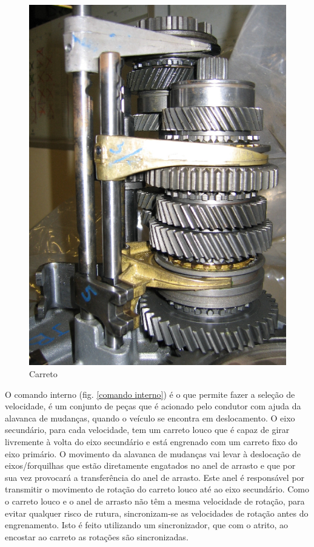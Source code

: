 \begin{figure}[H]
\centering
\includegraphics[scale=1.0]{figs/carretos}
\caption{Carreto \cite{formacaoCaixa}}\label{carreto}
\end{figure}

O comando interno (fig. \ref{comando interno}) é o que permite fazer a seleção de velocidade, é um conjunto de peças que é acionado pelo condutor com ajuda da alavanca de mudanças, quando o veículo se encontra em deslocamento. O eixo secundário, para cada velocidade, tem um carreto louco que é capaz de girar livremente à volta do eixo secundário e está engrenado com um carreto fixo do eixo primário. O movimento da alavanca de mudanças vai levar à deslocação de eixos/forquilhas que estão diretamente engatados no anel de arrasto e que por sua vez provocará a transferência do anel de arrasto. Este anel é responsável por transmitir o movimento de rotação do carreto louco até ao eixo secundário. Como o carreto louco e o anel de arrasto não têm a mesma velocidade de rotação, para evitar qualquer risco de rutura, sincronizam-se as velocidades de rotação antes do engrenamento. Isto é feito utilizando um sincronizador, que com o atrito, ao encostar ao carreto as rotações são sincronizadas.

